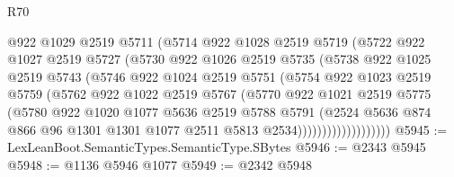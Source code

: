 \begin{lexlean}{R70}
\begin{coremodule}
                      @922
                      @1029
                      @2519
                      @5711
                      (@5714
                        @922
                        @1028
                        @2519
                        @5719
                        (@5722
                          @922
                          @1027
                          @2519
                          @5727
                          (@5730
                            @922
                            @1026
                            @2519
                            @5735
                            (@5738
                              @922
                              @1025
                              @2519
                              @5743
                              (@5746
                                @922
                                @1024
                                @2519
                                @5751
                                (@5754
                                  @922
                                  @1023
                                  @2519
                                  @5759
                                  (@5762
                                    @922
                                    @1022
                                    @2519
                                    @5767
                                    (@5770
                                      @922
                                      @1021
                                      @2519
                                      @5775
                                      (@5780
                                        @922
                                        @1020
                                        @1077
                                        @5636
                                        @2519
                                        @5788
                                        @5791
                                        (@2524
                                          @5636
                                          @874
                                          @866
                                          @96
                                          @1301
                                          @1301
                                          @1077
                                          @2511
                                          @5813
                                          @2534)))))))))))))))))))
@5945 := LexLeanBoot.SemanticTypes.SemanticType.SBytes
@5946 := @2343 @5945
@5948 := @1136 @5946 @1077
@5949 := @2342 @5948

\end{coremodule}
\end{lexlean}
